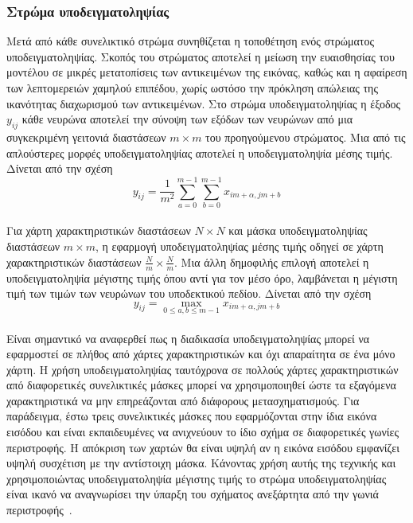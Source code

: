 \documentclass[12pt]{article}
\numberwithin{equation}{section}
\begin{document}
\subsubsection{Στρώμα υποδειγματοληψίας}

Μετά από κάθε συνελικτικό στρώμα συνηθίζεται η τοποθέτηση ενός στρώματος υποδειγματοληψίας. Σκοπός του στρώματος αποτελεί η μείωση την ευαισθησίας του μοντέλου σε μικρές μετατοπίσεις των αντικειμένων της εικόνας, καθώς και η αφαίρεση των λεπτομερειών χαμηλού επιπέδου, χωρίς ωστόσο την πρόκληση απώλειας της ικανότητας διαχωρισμού των αντικειμένων. Στο στρώμα υποδειγματοληψίας η έξοδος \(y_{ij}\) κάθε νευρώνα αποτελεί την σύνοψη των εξόδων των νευρώνων από μια συγκεκριμένη γειτονιά διαστάσεων \(m \times m\) του προηγούμενου στρώματος. Μια από τις απλούστερες μορφές υποδειγματοληψίας αποτελεί η υποδειγματοληψία μέσης τιμής. Δίνεται από την σχέση\\

\begin{equation}
y_{ij} = \frac{1}{m^2} \sum_{a=0}^{m-1} \sum_{b=0}^{m-1} x_{im+\alpha, jm+b}
\end{equation}\\

Για χάρτη χαρακτηριστικών διαστάσεων \(N \times N\) και μάσκα υποδειγματοληψίας διαστάσεων \(m \times m\), η εφαρμογή υποδειγματοληψίας μέσης τιμής οδηγεί σε χάρτη χαρακτηριστικών διαστάσεων \(\frac{N}{m} \times \frac{N}{m}\). Μια άλλη δημοφιλής επιλογή αποτελεί η υποδειγματοληψία μέγιστης τιμής όπου αντί για τον μέσο όρο, λαμβάνεται η μέγιστη τιμή των τιμών των νευρώνων του υποδεκτικού πεδίου. Δίνεται από την σχέση\\

\begin{equation}
y_{ij} = \max_{0 \leq a,b \leq m-1} x_{im+\alpha, jm+b}
\end{equation}\\

Είναι σημαντικό να αναφερθεί πως η διαδικασία υποδειγματοληψίας μπορεί να εφαρμοστεί σε πλήθος από χάρτες χαρακτηριστικών και όχι απαραίτητα σε ένα μόνο χάρτη. Η χρήση υποδειγματοληψίας ταυτόχρονα σε πολλούς χάρτες χαρακτηριστικών από διαφορετικές συνελικτικές μάσκες μπορεί να χρησιμοποιηθεί ώστε τα εξαγόμενα χαρακτηριστικά να μην επηρεάζονται από διάφορους μετασχηματισμούς. Για παράδειγμα, έστω τρεις συνελικτικές μάσκες που εφαρμόζονται στην ίδια εικόνα εισόδου και είναι εκπαιδευμένες να ανιχνεύουν το ίδιο σχήμα σε διαφορετικές γωνίες περιστροφής. Η απόκριση των χαρτών θα είναι υψηλή αν η εικόνα εισόδου εμφανίζει υψηλή συσχέτιση με την αντίστοιχη μάσκα. Κάνοντας χρήση αυτής της τεχνικής και χρησιμοποιώντας υποδειγματοληψία μέγιστης τιμής το στρώμα υποδειγματοληψίας είναι ικανό να αναγνωρίσει την ύπαρξη του σχήματος ανεξάρτητα από την γωνιά περιστροφής~\cite{BotsisDiamantaras2019}. \\
\end{document}

